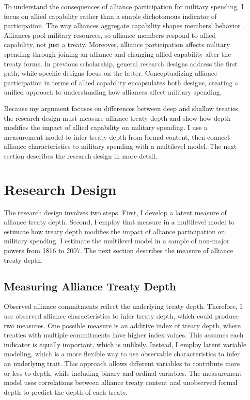 \documentclass[12pt]{article}
\begin{document}
To understand the consequences of alliance participation for military spending, I focus on allied capability rather than a simple dichotomous indicator of participation.
The way alliances aggregate capability shapes members' behavior \citep{FordhamPoast2014}. 
Alliances pool military resources, so alliance members respond to allied capability, not just a treaty. 
Moreover, alliance participation affects military spending through joining an alliance and changing allied capability after the treaty forms. 
In previous scholarship, general research designs address the first path, while specific designs focus on the latter. 
Conceptualizing alliance participation in terms of allied capability encapsulates both designs, creating a unified approach to understanding how alliances affect military spending. 


Because my argument focuses on differences between deep and shallow treaties, the research design must measure alliance treaty depth and show how depth modifies the impact of allied capability on military spending.  
I use a measurement model to infer treaty depth from formal content, then connect alliance characteristics to military spending with a multilevel model. 
The next section describes the research design in more detail. 



\section*{Research Design} 


The research design involves two steps. 
First, I develop a latent measure of alliance treaty depth. 
Second, I employ that measure in a multilevel model to estimate how treaty depth modifies the impact of alliance participation on military spending. 
I estimate the multilevel model in a sample of non-major powers from 1816 to 2007. 
The next section describes the measure of alliance treaty depth. 


\subsection*{Measuring Alliance Treaty Depth} 


Observed alliance commitments reflect the underlying treaty depth. 
Therefore, I use observed alliance characteristics to infer treaty depth, which could produce two measures. 
One possible measure is an additive index of treaty depth, where treaties with multiple commitments have higher index values. 
This assumes each indicator is equally important, which is unlikely. 
Instead, I employ latent variable modeling, which is a more flexible way to use observable characteristics to infer an underlying trait. 
This approach allows different variables to contribute more or less to depth, while including binary and ordinal variables.  
The measurement model uses correlations between alliance treaty content and unobserved formal depth to predict the depth of each treaty. 
\end{document}
